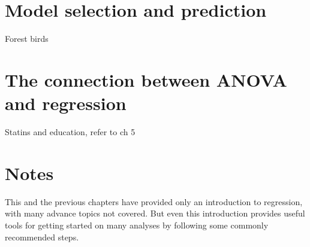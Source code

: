 


\section{Model selection and prediction}

Forest birds

\section{The connection between ANOVA and regression}

Statins and education, refer to ch 5


\section{Notes}

This and the previous chapters have provided only an introduction to regression, with many advance topics not covered. But even this introduction provides useful tools for getting started on many analyses by following some commonly recommended steps.

